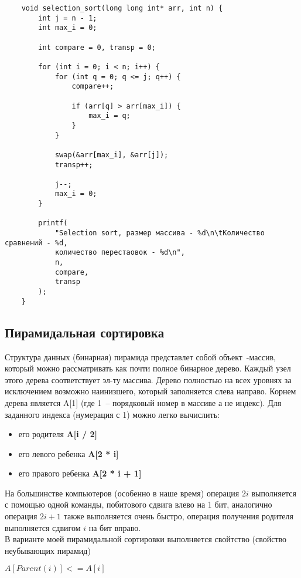 \documentclass[a4paper,12pt,titlepage,finall]{article}
\begin{document}
\begin{verbatim}
    void selection_sort(long long int* arr, int n) {
        int j = n - 1;
        int max_i = 0;

        int compare = 0, transp = 0;

        for (int i = 0; i < n; i++) {
            for (int q = 0; q <= j; q++) {
                compare++;

                if (arr[q] > arr[max_i]) {
                    max_i = q;  
                }
            }

            swap(&arr[max_i], &arr[j]);
            transp++;

            j--;
            max_i = 0;
        }

        printf(
            "Selection sort, размер массива - %d\n\tКоличество сравнений - %d,
            количество перестаовок - %d\n",
            n,
            compare,
            transp
        );
    }
\end{verbatim}


\newpage

\subsection{Пирамидальная сортировка}

Структура данных (бинарная) пирамида представлет
собой объект~-массив, который можно рассматривать как почти полное бинарное дерево.
Каждый узел этого дерева соответствует эл-ту массива. Дерево полностью на всех уровнях 
за исключением возможно наинизшего, который заполняется слева направо.
Корнем дерева является A[1] (где 1~-- порядковый номер в массиве а не индекс). Для заданного 
индекса (нумерация с 1) можно легко вычислить:
\begin{itemize}
    \item его родителя \textbf{A[i / 2]}
    \item его левого ребенка \textbf{A[2 * i]}
    \item его правого ребенка \textbf{A[2 * i + 1]}
\end{itemize}

На большинстве компьютеров (особенно в наше время) операция $2i$ выполняется с помощью одной
команды, побитового сдвига влево на 1 бит, аналогично 
операция $2i + 1$ также выполняется очень быстро, операция получения родителя выполняется
сдвигом $i$ на бит вправо.\\
В варианте моей пирамидальной сортировки выполняется свойтство (свойство неубывающих пирамид) \\
\begin{center}
    $A[Parent(i)] <= A[i]$
\end{center}
\end{document}
